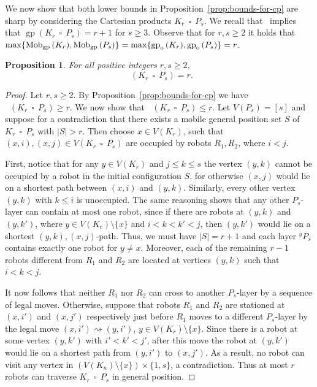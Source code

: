 \documentclass[a4paper,12pt]{article}
\DeclareMathOperator{\mob}{Mob_{gp}}
\DeclareMathOperator{\gp}{gp}
\DeclareMathOperator{\cp}{\,\square\,}
\newcommand{\gpo}{\gp_{\rm o}}
\newtheorem{proposition}[theorem]{Proposition}
\theoremstyle{definition}
\newcommand{\move}{\rightsquigarrow}
\begin{document}
	We now show that both lower bounds in Proposition~\ref{prop:bounds-for-cp} are sharp by considering the Cartesian products $K_r \cp P_s$. We recall that~\cite[Theorem 3.2]{tian-2021a} implies that $\gp(K_r \cp P_s) = r+1$ for $s\ge 3$. Observe that for $r,s \geq 2$ it holds that $\max \{ \mob{(K_r)}, \mob{(P_s)} \} = \max\{ \gpo{(K_r)}, \gpo{(P_s)} \} = r$.
	
	\begin{proposition}\label{prop:clique cp path}
		For all positive integers $r,s \geq 2$, \[\mob(K_r \cp P_s) = r.\]
	\end{proposition}
	
	\begin{proof}
		Let $r,s \geq 2$. By Proposition~\ref{prop:bounds-for-cp} we have $\mob(K_r \cp P_s) \geq r$. We now show that $\mob(K_r \cp P_s) \leq r$. Let $V(P_s) = [s]$ and suppose for a contradiction that there exists a mobile general position set $S$ of $K_r \cp P_s$ with $|S| > r$. Then choose $x \in V(K_r)$, such that $(x, i), (x,j) \in V(K_r \cp P_s)$ are occupied by robots $R_1, R_2$, where $i < j$. 
		
		First, notice that for any $y \in V(K_r)$ and $j \leq k \leq s$ the vertex $(y,k)$ cannot be occupied by a robot in the initial configuration $S$, for otherwise $(x,j)$ would lie on a shortest path between $(x,i)$ and $(y,k)$. Similarly, every other vertex $(y,k)$ with $k \leq i$ is unoccupied. The same reasoning shows that any other $P_s$-layer can contain at most one robot, since if there are robots at $(y,k)$ and $(y,k')$, where $y \in V(K_r) \setminus \{ x\} $ and $i < k < k' < j$, then $(y,k')$ would lie on a shortest $(y,k),(x,j)$-path. Thus, we must have $|S| = r+1$ and each layer $^yP_s$ contains exactly one robot for $y \neq x$. Moreover, each of the remaining $r-1$ robots different from $R_1$ and $R_2$ are located at vertices $(y,k)$ such that $i<k<j$.
		
		It now follows that neither $R_1$ nor $R_2$ can cross to another $P_s$-layer by a sequence of legal moves. Otherwise, suppose that robots $R_1$ and $R_2$ are stationed at $(x,i')$ and $(x,j')$ respectively just before $R_1$ moves to a different $P_s$-layer by the legal move $(x,i') \move (y,i')$, $y \in V(K_r) \setminus \{ x\} $. Since there is a robot at some vertex $(y,k')$ with $i' < k' < j'$, after this move the robot at $(y,k')$ would lie on a shortest path from $(y,i')$ to $(x,j')$. As a result, no robot can visit any vertex in $(V(K_n)\setminus \{ x\} ) \times \{ 1,s\} $, a contradiction. Thus at most $r$ robots can traverse $K_r \cp P_s$ in general position.
	\end{proof}
	
\end{document}
